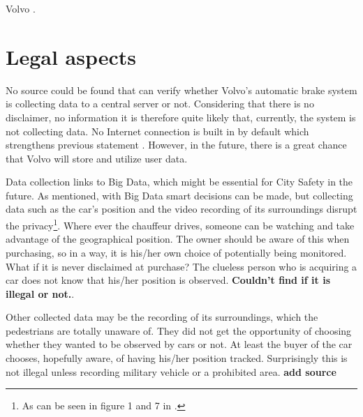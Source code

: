 \documentclass[conference]{IEEEtran}
\begin{document}
Volvo . \cite{PrivacyPolicy}



\section{Legal aspects}
No source could be found that can verify whether Volvo's automatic brake system is collecting data to a central server or not. Considering that there is no disclaimer, no information it is therefore quite likely that, currently, the system is not collecting data. No Internet connection is built in by default which strengthens previous statement \cite{SensusConnect}. However, in the future, there is a great chance that Volvo will store and utilize user data.

Data collection links to Big Data, which might be essential for City Safety in the future. As mentioned, with Big Data smart decisions can be made, but collecting data such as the car's position and the video recording of its surroundings disrupt the privacy\footnote{As can be seen in figure 1 and 7 in \cite{SysDescription}.}.  Where ever the chauffeur drives, someone can be watching and take advantage of the geographical position. The owner should be aware of this when purchasing, so in a way, it is his/her own choice of potentially being monitored. What if it is never disclaimed at purchase? The clueless person who is acquiring a car does not know that his/her position is observed. \textbf{Couldn't find if it is illegal or not.}.

Other collected data may be the recording of its surroundings, which the pedestrians are totally unaware of. They did not get the opportunity of choosing whether they wanted to be observed by cars or not. At least the buyer of the car chooses, hopefully aware, of having his/her position tracked. Surprisingly this is not illegal unless recording military vehicle or a prohibited area. \textbf{add source}
\end{document}

